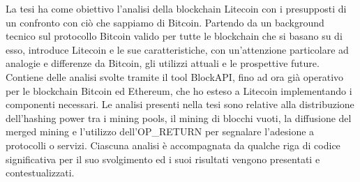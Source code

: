 \vspace{4cm}
La tesi ha come obiettivo l'analisi della blockchain Litecoin con i presupposti di un confronto con ciò che sappiamo di Bitcoin. Partendo da un background tecnico sul protocollo Bitcoin valido per tutte le blockchain che si basano su di esso, introduce Litecoin e le sue caratteristiche, con un'attenzione particolare ad analogie e differenze da Bitcoin, gli utilizzi attuali e le prospettive future. Contiene delle analisi svolte tramite il tool BlockAPI, fino ad ora già operativo per le blockchain Bitcoin ed Ethereum, che ho esteso a Litecoin implementando i componenti necessari. Le analisi presenti nella tesi sono relative alla distribuzione dell’hashing power tra i mining pools, il mining di blocchi vuoti, la diffusione del merged mining e l’utilizzo dell’OP\_RETURN per segnalare l’adesione a protocolli o servizi. Ciascuna analisi è accompagnata da qualche riga di codice significativa per il suo svolgimento ed i suoi risultati vengono presentati e contestualizzati.